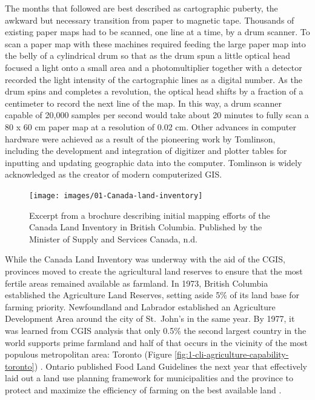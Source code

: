 \documentclass[
]{book}
\begin{document}
The months that followed are best described as cartographic puberty, the awkward but necessary transition from paper to magnetic tape. Thousands of existing paper maps had to be scanned, one line at a time, by a drum scanner. To scan a paper map with these machines required feeding the large paper map into the belly of a cylindrical drum so that as the drum spun a little optical head focused a light onto a small area and a photomultiplier together with a detector recorded the light intensity of the cartographic lines as a digital number. As the drum spins and completes a revolution, the optical head shifts by a fraction of a centimeter to record the next line of the map. In this way, a drum scanner capable of 20,000 samples per second would take about 20 minutes to fully scan a 80 x 60 cm paper map at a resolution of 0.02 cm. Other advances in computer hardware were achieved as a result of the pioneering work by Tomlinson, including the development and integration of digitizer and plotter tables for inputting and updating geographic data into the computer. Tomlinson is widely acknowledged as the creator of modern computerized GIS.

\begin{figure}
\texttt{[image: images/01-Canada-land-inventory]} \caption{Excerpt from a brochure describing initial mapping efforts of the Canada Land Inventory in British Columbia. Published by the Minister of Supply and Services Canada, n.d.}\label{fig:1-Canada-land-inventory}
\end{figure}

While the Canada Land Inventory was underway with the aid of the CGIS, provinces moved to create the agricultural land reserves to ensure that the most fertile areas remained available as farmland. In 1973, British Columbia established the Agriculture Land Reserves, setting aside 5\% of its land base for farming priority. Newfoundland and Labrador established an Agriculture Development Area around the city of St.~John's in the same year. By 1977, it was learned from CGIS analysis that only 0.5\% the second largest country in the world supports prime farmland and half of that occurs in the vicinity of the most populous metropolitan area: Toronto (Figure \ref{fig:1-cli-agriculture-capability-toronto}) \citep{manning_overview_1977}. Ontario published Food Land Guidelines the next year that effectively laid out a land use planning framework for municipalities and the province to protect and maximize the efficiency of farming on the best available land \citep{ministry_of_agriculture_and_food_food_1978}.
\end{document}
